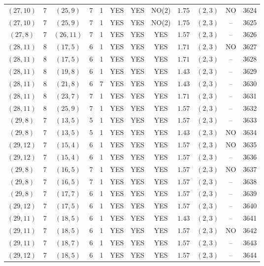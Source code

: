\begin{longtable}{|c|c|c|c|c|c|c|c|c|c|c|c|}
$(27,10)$ & 7 & $(25,9)$ & 7 & 1 & YES & YES & NO(2) & $1.75$ & $(2,3)$ & NO & 3624\\
$(27,10)$ & 7 & $(25,9)$ & 7 & 1 & YES & YES & NO(2) & $1.75$ & $(2,3)$ & -- & 3625\\
$(27,8)$ & 7 & $(26,11)$ & 7 & 1 & YES & YES & YES & $1.57$ & $(2,3)$ & -- & 3626\\
$(28,11)$ & 8 & $(17,5)$ & 6 & 1 & YES & YES & YES & $1.71$ & $(2,3)$ & NO & 3627\\
$(28,11)$ & 8 & $(17,5)$ & 6 & 1 & YES & YES & YES & $1.71$ & $(2,3)$ & -- & 3628\\
$(28,11)$ & 8 & $(19,8)$ & 6 & 1 & YES & YES & YES & $1.43$ & $(2,3)$ & -- & 3629\\
$(28,11)$ & 8 & $(21,8)$ & 6 & 7 & YES & YES & YES & $1.43$ & $(2,3)$ & -- & 3630\\
$(28,11)$ & 8 & $(23,7)$ & 7 & 1 & YES & YES & YES & $1.71$ & $(2,3)$ & -- & 3631\\
$(28,11)$ & 8 & $(25,9)$ & 7 & 1 & YES & YES & YES & $1.57$ & $(2,3)$ & -- & 3632\\
$(29,8)$ & 7 & $(13,5)$ & 5 & 1 & YES & YES & YES & $1.57$ & $(2,3)$ & -- & 3633\\
$(29,8)$ & 7 & $(13,5)$ & 5 & 1 & YES & YES & YES & $1.43$ & $(2,3)$ & NO & 3634\\
$(29,12)$ & 7 & $(15,4)$ & 6 & 1 & YES & YES & YES & $1.57$ & $(2,3)$ & NO & 3635\\
$(29,12)$ & 7 & $(15,4)$ & 6 & 1 & YES & YES & YES & $1.57$ & $(2,3)$ & -- & 3636\\
$(29,8)$ & 7 & $(16,5)$ & 7 & 1 & YES & YES & YES & $1.57$ & $(2,3)$ & NO & 3637\\
$(29,8)$ & 7 & $(16,5)$ & 7 & 1 & YES & YES & YES & $1.57$ & $(2,3)$ & -- & 3638\\
$(29,8)$ & 7 & $(17,7)$ & 6 & 1 & YES & YES & YES & $1.57$ & $(2,3)$ & -- & 3639\\
$(29,12)$ & 7 & $(17,5)$ & 6 & 1 & YES & YES & YES & $1.57$ & $(2,3)$ & -- & 3640\\
$(29,11)$ & 7 & $(18,5)$ & 6 & 1 & YES & YES & YES & $1.43$ & $(2,3)$ & -- & 3641\\
$(29,11)$ & 7 & $(18,5)$ & 6 & 1 & YES & YES & YES & $1.57$ & $(2,3)$ & NO & 3642\\
$(29,11)$ & 7 & $(18,7)$ & 6 & 1 & YES & YES & YES & $1.57$ & $(2,3)$ & -- & 3643\\
$(29,12)$ & 7 & $(18,5)$ & 6 & 1 & YES & YES & YES & $1.57$ & $(2,3)$ & -- & 3644\\

\end{longtable}
